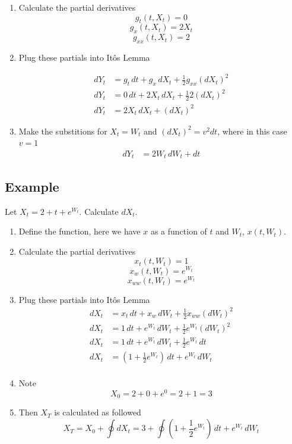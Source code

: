 \documentclass[11pt]{article}
\begin{document}
\begin{enumerate}
    \item Calculate the partial derivatives 
    \[g_t(t, X_t) = 0\]
    \[g_x(t, X_t) = 2X_t\]
    \[g_{xx}(t, X_t) = 2\]
    \item Plug these partials into It\^{o}s Lemma
    
    \begin{align*}
        dY_t &= g_t \,dt + g_x \,dX_t + \frac{1}{2} g_{xx} {(dX_t)}^2 \\
        dY_t &= 0 \,dt + 2X_t \,dX_t + \frac{1}{2} 2 {(dX_t)}^2 \\
        dY_t &= 2X_t \,dX_t + {(dX_t)}^2 
    \end{align*}
    \item Make the substitions for $X_t = W_t$ and ${(dX_t)}^2 = v^2dt$, where in this case 
    $v=1$
    \begin{align*}
        dY_t &= 2W_t \,dW_t + dt
    \end{align*}
\end{enumerate}

\subsection{Example}
Let $X_t = 2 + t + e^{W_t}$. Calculate $dX_t$. \\ 
\begin{enumerate}
    \item Define the function, here we have $x$ as a function of $t$ and $W_t$, $x(t, W_t)$.
    \item Calculate the partial derivatives 
    \[x_t(t, W_t) = 1 \]
    \[x_w(t, W_t) = e^{W_t} \]
    \[x_{ww}(t, W_t) = e^{W_t} \]
    \item Plug these partials into It\^{o}s Lemma
    \begin{align*}
        dX_t &= x_t \,dt + x_w \,dW_t + \frac{1}{2} x_{ww} {(dW_t)}^2 \\
        dX_t &= 1 \,dt + e^{W_t} \,dW_t + \frac{1}{2} e^{W_t} {(dW_t)}^2 \\
        dX_t &= 1 \,dt + e^{W_t} \,dW_t + \frac{1}{2} e^{W_t} \,dt \\
        dX_t &= (1 +  \frac{1}{2} e^{W_t}) \,dt + e^{W_t} \,dW_t \\
    \end{align*}
    \item Note 
    \[X_0 = 2 + 0 + e^0 = 2 + 1 = 3\]
    \item Then $X_T$ is calculated as followed 
    \[X_T  = X_0 + \oint dX_t = 3 + \oint (1 +  \frac{1}{2} e^{W_t}) \,dt + e^{W_t} \,dW_t \]
\end{enumerate}
\end{document}
